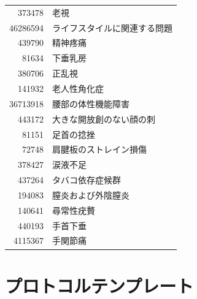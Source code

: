 \documentclass[
  11pt]{book}
\theoremstyle{definition}
\theoremstyle{definition}
\theoremstyle{definition}
\theoremstyle{definition}
\theoremstyle{remark}
\begin{document}
\begin{longtable}[]{@{}rl@{}}
373478 & 老視 \\
46286594 & ライフスタイルに関連する問題 \\
439790 & 精神疼痛 \\
81634 & 下垂乳房 \\
380706 & 正乱視 \\
141932 & 老人性角化症 \\
36713918 & 腰部の体性機能障害 \\
443172 & 大きな開放創のない顔の刺 \\
81151 & 足首の捻挫 \\
72748 & 肩腱板のストレイン損傷 \\
378427 & 涙液不足 \\
437264 & タバコ依存症候群 \\
194083 & 膣炎および外陰膣炎 \\
140641 & 尋常性疣贅 \\
440193 & 手首下垂 \\
4115367 & 手関節痛 \\
\end{longtable}

\chapter{プロトコルテンプレート}\label{ProtocolTemplate}
\end{document}
